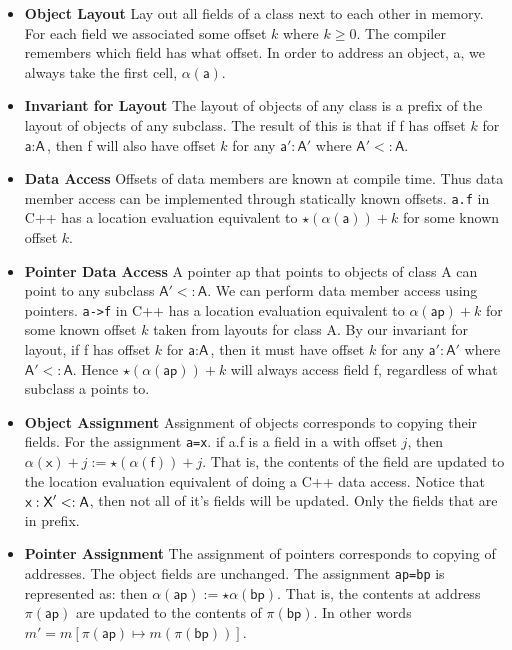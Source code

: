 \begin{itemize}   
\renewcommand{\labelitemi}{$\Box$}
\item \textbf{Object Layout} Lay out all fields of a class next to each 
other in memory. For each field we associated some offset $k$ where $k \geqslant 0$. 
The compiler remembers which field has what offset.  
In order to address an object, \textsf{a}, we always take the first cell, $\alpha(\textsf{a})$.
\item \textbf{Invariant for Layout}  The layout of objects of any class is 
a prefix of the layout of objects of any subclass. 
The result of this is that if \textsf{f} has offset $k$ for $\textsf{a}:\textsf{A}$, 
then \textsf{f} will also have offset $k$ for any $\textsf{a}':\textsf{A}'$ where $\textsf{A}' <: \textsf{A}$.
\item \textbf{Data Access} Offsets of data members are known at compile time. 
Thus data member access can be implemented through statically known offsets. 
\lstinline{a.f} in C++ has a location evaluation equivalent to $\star(\alpha(\textsf{a})) + k$ for some known offset $k$. 
\item \textbf{Pointer Data Access} 
A pointer \textsf{ap} that points to objects of class \textsf{A} 
can point to any subclass $\textsf{A}' <: \textsf{A}$. 
We can perform data member access using pointers.
\lstinline{a->f} in C++ has a location evaluation equivalent to $\alpha(\textsf{ap}) + k$ for 
some known offset $k$ taken from layouts for class \textsf{A}.
By our invariant for layout, 
if \textsf{f} has offset $k$ for $\textsf{a}:\textsf{A}$, 
then it must have offset $k$ for any $\textsf{a}':\textsf{A}'$ where $\textsf{A}' <: \textsf{A}$.
Hence $\star(\alpha(\textsf{ap})) + k$ will always access field \textsf{f}, regardless of 
what subclass \textsf{a} points to.
\item \textbf{Object Assignment} 
Assignment of objects corresponds to copying their fields. 
For the assignment \lstinline{a=x}.
if \textsf{a.f} is a field in \textsf{a} with offset $j$, 
then $\alpha(\textsf{x}) + j := \star(\alpha(\textsf{f})) + j$. 
That is, the contents of the field are updated to the 
location evaluation equivalent of doing a C++ data access.
Notice that $\textsf{x}:\textsf{\textsf{X}}' <: \textsf{A}$, then not all 
of it's fields will be updated. Only the fields that 
are in prefix. 
\item \textbf{Pointer Assignment} 
The assignment of pointers corresponds to 
copying of addresses. The object fields are unchanged. 
The assignment \lstinline{ap=bp} is represented as:
then $\alpha(\textsf{ap}) := \star \alpha(\textsf{bp})$. 
That is, the contents at address $\pi(\textsf{ap})$ are updated 
to the contents of $\pi(\textsf{bp})$. In other words
$m' = m[\pi(\textsf{ap}) \mapsto m(\pi(\textsf{bp}))]$.

\end{itemize} 

